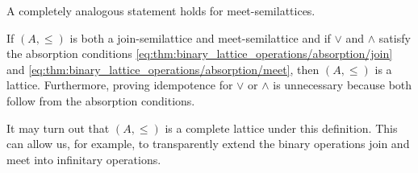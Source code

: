 \begin{proposition}
\begin{thmenum}
    A completely analogous statement holds for meet-semilattices.

    If \( (A, \leq) \) is both a join-semilattice and meet-semilattice and if \( \vee \) and \( \wedge \) satisfy the absorption conditions \eqref{eq:thm:binary_lattice_operations/absorption/join} and \eqref{eq:thm:binary_lattice_operations/absorption/meet}, then \( (A, \leq) \) is a lattice. Furthermore, proving idempotence for \( \vee \) or \( \wedge \) is unnecessary because both follow from the absorption conditions.

    It may turn out that \( (A, \leq) \) is a complete lattice under this definition. This can allow us, for example, to transparently extend the binary operations join and meet into infinitary operations.
  \end{thmenum}
\end{proposition}

